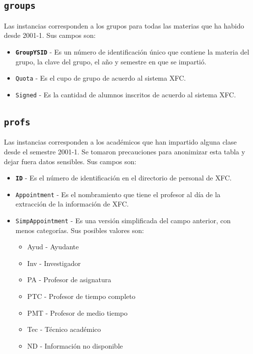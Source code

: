 \documentclass[twocolumn]{article}
\theoremstyle{definition}
\begin{document}
\subsection{\texttt{groups}}

Las instancias corresponden a los grupos para todas las materias que ha habido desde 2001-1. Sus campos son:

\begin{itemize}
    \item \texttt{\textbf{GroupYSID}} - Es un número de identificación único que contiene la materia del grupo, la clave del grupo, el año y semestre en que se impartió.
    \item \texttt{Quota} - Es el cupo de grupo de acuerdo al sistema XFC.
    \item \texttt{Signed} - Es la cantidad de alumnos inscritos de acuerdo al sistema XFC.
\end{itemize}

\subsection{\texttt{profs}}

Las instancias corresponden a los académicos que han impartido alguna clase desde el semestre 2001-1. Se tomaron precauciones para anonimizar esta tabla y dejar fuera datos sensibles. Sus campos son:

\begin{itemize}
    \item \texttt{\textbf{ID}} - Es el número de identificación en el directorio de personal de XFC.
    \item \texttt{Appointment} - Es el nombramiento que tiene el profesor al día de la extracción de la información de XFC.
    \item \texttt{SimpAppointment} - Es una versión simplificada del campo anterior, con menos categorías. Sus posibles valores son:
    \begin{itemize}
        \item Ayud - Ayudante
        \item Inv - Investigador
        \item PA - Profesor de asignatura
        \item PTC - Profesor de tiempo completo
        \item PMT - Profesor de medio tiempo
        \item Tec - Técnico académico
        \item ND - Información no disponible
    \end{itemize}
\end{itemize}
\end{document}
